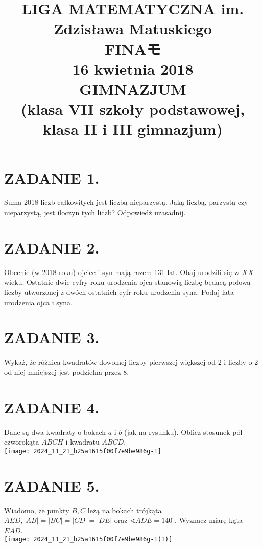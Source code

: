\documentclass[10pt]{article}
\title{LIGA MATEMATYCZNA im. Zdzisława Matuskiego \\
 FINAモ \\
 16 kwietnia 2018 \\
 GIMNAZJUM \\
 (klasa VII szkoły podstawowej, klasa II i III gimnazjum) }
\author{}
\date{}
\newcommand\varangle{\mathop{\sphericalangle}}
\begin{document}
\maketitle
\section*{ZADANIE 1.}
Suma 2018 liczb całkowitych jest liczbą nieparzystą. Jaką liczbą, parzystą czy nieparzystą, jest iloczyn tych liczb? Odpowiedź uzasadnij.

\section*{ZADANIE 2.}
Obecnie (w 2018 roku) ojciec i syn mają razem 131 lat. Obaj urodzili się w \(X X\) wieku. Ostatnie dwie cyfry roku urodzenia ojca stanowią liczbę będącą połową liczby utworzonej z dwóch ostatnich cyfr roku urodzenia syna. Podaj lata urodzenia ojca i syna.

\section*{ZADANIE 3.}
Wykaż, że różnica kwadratów dowolnej liczby pierwszej większej od 2 i liczby o 2 od niej mniejszej jest podzielna przez 8.

\section*{ZADANIE 4.}
Dane są dwa kwadraty o bokach \(a\) i \(b\) (jak na rysunku). Oblicz stosunek pól czworokąta \(A B C H\) i kwadratu \(A B C D\).\\
\texttt{[image: 2024\_11\_21\_b25a1615f00f7e9be986g-1]}

\section*{ZADANIE 5.}
Wiadomo, że punkty \(B, C\) leżą na bokach trójkąta \(A E D,|A B|=|B C|=|C D|=|D E|\) oraz \(\varangle A D E=140^{\circ}\). Wyznacz miarę kąta \(E A D\).\\
\texttt{[image: 2024\_11\_21\_b25a1615f00f7e9be986g-1(1)]}
\end{document}
